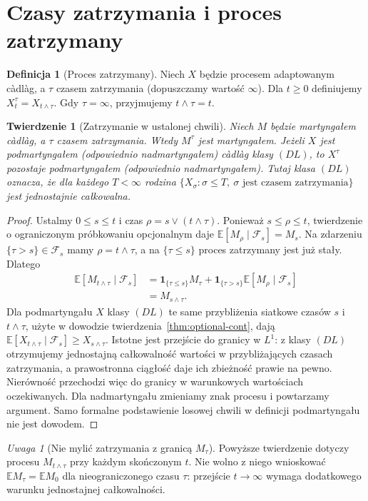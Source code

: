 \documentclass[11pt,a4paper,oneside]{report}
\numberwithin{equation}{chapter}
\theoremstyle{plain}
\newtheorem{twierdzenie}{Twierdzenie}[chapter]
\theoremstyle{definition}
\newtheorem{definicja}{Definicja}[chapter]
\theoremstyle{remark}
\newtheorem{uwaga}{Uwaga}[chapter]
\newcommand{\E}{\mathbb{E}}
\newcommand{\calF}{\mathcal{F}}
\newcommand{\ind}[1]{\mathbf{1}_{#1}}
\begin{document}
\section{Czasy zatrzymania i proces zatrzymany}
\begin{definicja}[Proces zatrzymany]
Niech $X$ będzie procesem adaptowanym c\`adl\`ag,
a $\tau$ czasem zatrzymania (dopuszczamy wartość $\infty$).
Dla $t\ge0$ definiujemy $X_t^\tau=X_{t\wedge\tau}$.
Gdy $\tau=\infty$, przyjmujemy $t\wedge\tau=t$.
\end{definicja}

\begin{twierdzenie}[Zatrzymanie w ustalonej chwili]
Niech $M$ będzie martyngałem c\`adl\`ag, a $\tau$
czasem zatrzymania. Wtedy $M^\tau$ jest martyngałem.
Jeżeli $X$ jest podmartyngałem (odpowiednio nadmartyngałem)
c\`adl\`ag \emph{klasy $(DL)$}, to $X^\tau$ pozostaje
podmartyngałem (odpowiednio nadmartyngałem).
Tutaj klasa $(DL)$ oznacza, że dla każdego $T<\infty$
rodzina $\{X_\sigma: \sigma\le T,\ \sigma
\text{ jest czasem zatrzymania}\}$ jest jednostajnie
całkowalna.
\end{twierdzenie}
\begin{proof}
Ustalmy $0\le s\le t$ i czas
$\rho=s\vee(t\wedge\tau)$. Ponieważ
$s\le\rho\le t$, twierdzenie o ograniczonym
próbkowaniu opcjonalnym daje
$\E[M_\rho\mid\calF_s]=M_s$.
Na zdarzeniu $\{\tau>s\}\in\calF_s$ mamy
$\rho=t\wedge\tau$, a na $\{\tau\le s\}$
proces zatrzymany jest już stały. Dlatego
\[
\begin{aligned}
\E[M_{t\wedge\tau}\mid\calF_s]
&=\ind{\{\tau\le s\}}M_\tau
 +\ind{\{\tau>s\}}\E[M_\rho\mid\calF_s]\\
&=M_{s\wedge\tau}.
\end{aligned}
\]
Dla podmartyngału $X$ klasy $(DL)$ te same przybliżenia
siatkowe czasów $s$ i $t\wedge\tau$, użyte w dowodzie
twierdzenia~\ref{thm:optional-cont}, dają
$\E[X_{t\wedge\tau}\mid\calF_s]\ge X_{s\wedge\tau}$.
Istotne jest przejście do granicy w $L^1$:
z klasy $(DL)$ otrzymujemy jednostajną całkowalność
wartości w przybliżających czasach zatrzymania,
a prawostronna ciągłość daje ich zbieżność prawie na pewno.
Nierówność przechodzi więc do granicy w warunkowych
wartościach oczekiwanych. Dla nadmartyngału zmieniamy
znak procesu i powtarzamy argument. Samo formalne
podstawienie losowej chwili w definicji podmartyngału
nie jest dowodem.
\end{proof}

\begin{uwaga}[Nie mylić zatrzymania z granicą $M_\tau$]
Powyższe twierdzenie dotyczy procesu $M_{t\wedge\tau}$
przy każdym skończonym $t$. Nie wolno z niego wnioskować
$\E M_\tau=\E M_0$ dla nieograniczonego czasu $\tau$:
przejście $t\to\infty$ wymaga dodatkowego warunku
jednostajnej całkowalności.
\end{uwaga}
\end{document}
